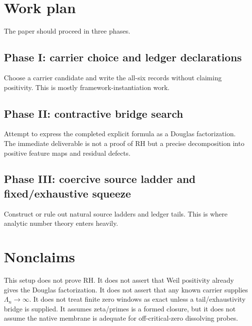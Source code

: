 \documentclass[11pt]{article}
\begin{document}
\section{Work plan}
The paper should proceed in three phases.

\subsection*{Phase I: carrier choice and ledger declarations}
Choose a carrier candidate and write the all-six records without claiming positivity.  This is mostly framework-instantiation work.

\subsection*{Phase II: contractive bridge search}
Attempt to express the completed explicit formula as a Douglas factorization.  The immediate deliverable is not a proof of RH but a precise decomposition into positive feature maps and residual defects.

\subsection*{Phase III: coercive source ladder and fixed/exhaustive squeeze}
Construct or rule out natural source ladders and ledger tails.  This is where analytic number theory enters heavily.

\section{Nonclaims}
This setup does not prove RH.  It does not assert that Weil positivity already gives the Douglas factorization.  It does not assert that any known carrier supplies \(\Lambda_n\to\infty\).  It does not treat finite zero windows as exact unless a tail/exhaustivity bridge is supplied.  It assumes zeta/primes is a formed closure, but it does not assume the native membrane is adequate for off-critical-zero dissolving probes.
\end{document}
